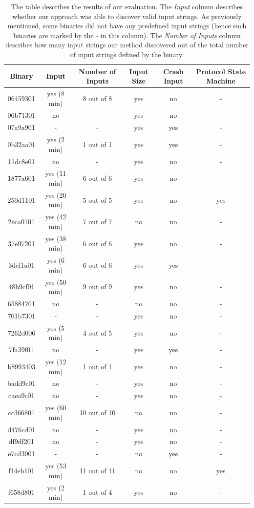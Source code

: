 \documentclass{acm_proc_article-sp}
\begin{document}
\begin{table}
\centering
\begin{tabular}{|c|c|c|c|c|c|} \hline
\textbf{Binary} & \textbf{Input} & \textbf{Number of Inputs} & \textbf{Input Size} & \textbf{Crash Input} & \textbf{Protocol State Machine}\\ \hline
06459301 & yes (8 min) & 8 out of 8 & yes & no & -\\ \hline
06b71301 & no & - & yes & no & -\\ \hline
07a9a901 & - & - & yes & yes & - \\ \hline
0b32aa01 & yes (2 min) & 1 out of 1 & yes & yes & - \\ \hline
11dc8e01 & no & - & yes & no & - \\ \hline
1877a601 & yes (11 min) & 6 out of 6 & yes & no & - \\ \hline
250d1101 & yes (20 min) & 5 out of 5 & yes & no & yes \\ \hline
2eca0101 & yes (42 min) & 7 out of 7 & no & no & - \\ \hline
37e97201 & yes (38 min) & 6 out of 6 & yes & no & - \\ \hline
3dcf1a01 & yes (6 min) & 6 out of 6 & yes & yes & - \\ \hline
48b9cf01 & yes (50 min) & 9 out of 9 & yes & no & - \\ \hline
65884701 & no & - & no & no & - \\ \hline
701b7301 & - & - & yes & no & - \\ \hline
7262d006 & yes (5 min) & 4 out of 5 & yes & no & - \\ \hline
7fa39f01 & no & - & yes & yes & - \\ \hline
b8993403 & yes (12 min) & 1 out of 1 & yes & no & - \\ \hline
badd9e01 & no & - & yes & no & - \\ \hline
caea9c01 & no & - & yes & no &  -\\ \hline
cc366801 & yes (60 min) & 10 out of 10& no & no & - \\ \hline
d476cd01 & no & - & yes & no & - \\ \hline
df9df201 & no & - & yes & no & - \\ \hline
e7cd3901 & - & - & no & yes & - \\ \hline
f14eb101 & yes (53 min) & 11 out of 11 & no & no & yes \\ \hline
f658d801 & yes (2 min) & 1 out of 4 & yes & no & - \\
\hline\end{tabular}
\caption{The table describes the results of our evaluation. The \textit{Input} column describes whether our approach was able to discover valid input strings. As previously mentioned, some binaries did not have any predefined input strings (hence such binaries are marked by the \textit{-} in this column). The \textit{Number of Inputs} column describes how many input strings our method discovered out of the total number of input strings defined by the binary.}
\label{binaryresults}
\end{table}
\end{document}
